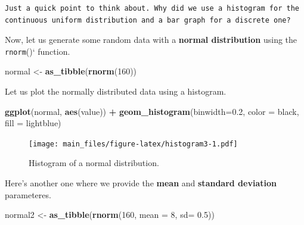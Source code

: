 \documentclass[
]{book}
\newenvironment{Shaded}{\begin{snugshade}}{\end{snugshade}}
\newcommand{\AttributeTok}[1]{\textcolor[rgb]{0.13,0.29,0.53}{#1}}
\newcommand{\DecValTok}[1]{\textcolor[rgb]{0.00,0.00,0.81}{#1}}
\newcommand{\FloatTok}[1]{\textcolor[rgb]{0.00,0.00,0.81}{#1}}
\newcommand{\FunctionTok}[1]{\textcolor[rgb]{0.13,0.29,0.53}{\textbf{#1}}}
\newcommand{\NormalTok}[1]{#1}
\newcommand{\OtherTok}[1]{\textcolor[rgb]{0.56,0.35,0.01}{#1}}
\newcommand{\SpecialCharTok}[1]{\textcolor[rgb]{0.81,0.36,0.00}{\textbf{#1}}}
\newcommand{\StringTok}[1]{\textcolor[rgb]{0.31,0.60,0.02}{#1}}
\begin{document}
\begin{verbatim}
Just a quick point to think about. Why did we use a histogram for the 
continuous uniform distribution and a bar graph for a discrete one? 
\end{verbatim}

Now, let us generate some random data with a \textbf{normal distribution} using the \texttt{rnorm}()` function.

\begin{Shaded}
\begin{Highlighting}[]
\NormalTok{normal }\OtherTok{\textless{}{-}} \FunctionTok{as\_tibble}\NormalTok{(}\FunctionTok{rnorm}\NormalTok{(}\DecValTok{160}\NormalTok{))}
\end{Highlighting}
\end{Shaded}

Let us plot the normally distributed data using a histogram.

\begin{Shaded}
\begin{Highlighting}[]
\FunctionTok{ggplot}\NormalTok{(normal, }\FunctionTok{aes}\NormalTok{(value)) }\SpecialCharTok{+}
        \FunctionTok{geom\_histogram}\NormalTok{(}\AttributeTok{binwidth=}\FloatTok{0.2}\NormalTok{,}
                       \AttributeTok{color =} \StringTok{\textquotesingle{}black\textquotesingle{}}\NormalTok{,}
                       \AttributeTok{fill =} \StringTok{\textquotesingle{}lightblue\textquotesingle{}}\NormalTok{)}
\end{Highlighting}
\end{Shaded}

\begin{figure}
\centering
\texttt{[image: main\_files/figure-latex/histogram3-1.pdf]}
\caption{\label{fig:histogram3}Histogram of a normal distribution.}
\end{figure}

Here's another one where we provide the \textbf{mean} and \textbf{standard deviation} parameteres.

\begin{Shaded}
\begin{Highlighting}[]
\NormalTok{normal2 }\OtherTok{\textless{}{-}} \FunctionTok{as\_tibble}\NormalTok{(}\FunctionTok{rnorm}\NormalTok{(}\DecValTok{160}\NormalTok{, }\AttributeTok{mean =} \DecValTok{8}\NormalTok{, }\AttributeTok{sd=} \FloatTok{0.5}\NormalTok{))}
\end{Highlighting}
\end{Shaded}
\end{document}
